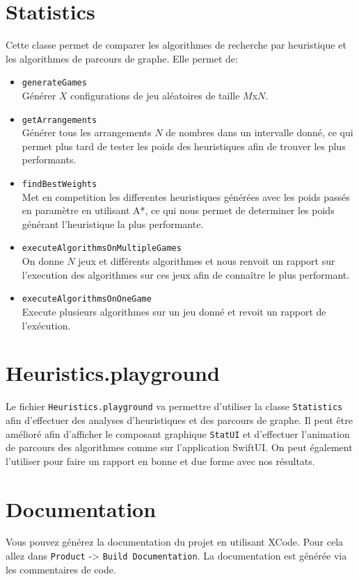 \section{Statistics}
Cette classe permet de comparer les algorithmes de recherche par heuristique et les algorithmes de parcours de graphe. Elle permet de:
\begin{itemize}
      \item \texttt{generateGames} \\
            Générer $X$ configurations de jeu aléatoires de taille $M$x$N$.
      \item \texttt{getArrangements} \\
            Générer tous les arrangements $N$ de nombres dans un intervalle donné, ce qui permet plus tard de tester les poids des heuristiques afin de trouver les plus performants.
      \item \texttt{findBestWeights} \\
            Met en competition les differentes heuristiques générées avec les poids passés en paramètre en utilisant A*, ce qui nous permet de determiner les poids générant l'heuristique la plus performante.
      \item \texttt{executeAlgorithmsOnMultipleGames} \\
            On donne $N$ jeux et différents algorithmes et nous renvoit un rapport sur l'execution des algorithmes sur ces jeux afin de connaître le plus performant.
      \item \texttt{executeAlgorithmsOnOneGame} \\
            Execute plusieurs algorithmes sur un jeu donné et revoit un rapport de l'exécution.
\end{itemize}

\section{Heuristics.playground}
Le fichier \texttt{Heuristics.playground} va permettre d'utiliser la classe \texttt{Statistics} afin d'effectuer des analyses d'heuristiques et des parcours de graphe. Il peut être amélioré afin d'afficher le composant graphique \texttt{StatUI} et d'effectuer l'animation de parcours des algorithmes comme sur l'application SwiftUI. On peut également l'utiliser pour faire un rapport en bonne et due forme avec nos résultats.

\section{Documentation}
Vous pouvez générez la documentation du projet en utilisant XCode. Pour cela allez dans \texttt{Product} -> \texttt{Build Documentation}. La documentation est générée via les commentaires de code.